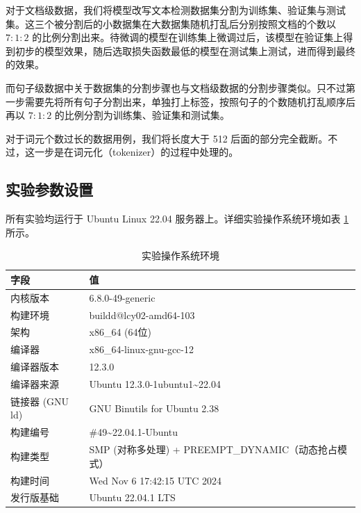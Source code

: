 对于文档级数据，我们将模型改写文本检测数据集分割为训练集、验证集与测试集。这三个被分割后的小数据集在大数据集随机打乱后分别按照文档的个数以 $7:1:2$ 的比例分割出来。待微调的模型在训练集上微调过后，该模型在验证集上得到初步的模型效果，随后选取损失函数最低的模型在测试集上测试，进而得到最终的效果。

而句子级数据中关于数据集的分割步骤也与文档级数据的分割步骤类似。只不过第一步需要先将所有句子分割出来，单独打上标签，按照句子的个数随机打乱顺序后再以 $7:1:2$ 的比例分割为训练集、验证集和测试集。

对于词元个数过长的数据用例，我们将长度大于 512 后面的部分完全截断。不过，这一步是在词元化（tokenizer）的过程中处理的。

\subsection{实验参数设置}
\label{sec:method-experiment-parameter}


所有实验均运行于 Ubuntu Linux 22.04 服务器上。详细实验操作系统环境如表 \ref{tab:os-env} 所示。

\begin{table}[h]
\centering
\caption{实验操作系统环境} \label{tab:os-env}
\begin{tabular}{ll}
\toprule
\textbf{字段}    & \textbf{值}                               \\ \midrule
内核版本           & 6.8.0-49-generic                         \\
构建环境           & buildd@lcy02-amd64-103                   \\
架构             & x86\_64 (64位)                             \\
编译器            & x86\_64-linux-gnu-gcc-12                  \\
编译器版本          & 12.3.0                                   \\
编译器来源          & Ubuntu 12.3.0-1ubuntu1\textasciitilde22.04             \\
链接器   (GNU ld) & GNU Binutils for Ubuntu 2.38             \\
构建编号           & \#49\textasciitilde22.04.1-Ubuntu                       \\
构建类型           & SMP (对称多处理) + PREEMPT\_DYNAMIC（动态抢占模式） \\
构建时间           & Wed Nov 6 17:42:15 UTC 2024              \\
发行版基础          & Ubuntu 22.04.1 LTS                       \\ \bottomrule
\end{tabular}
\end{table}

